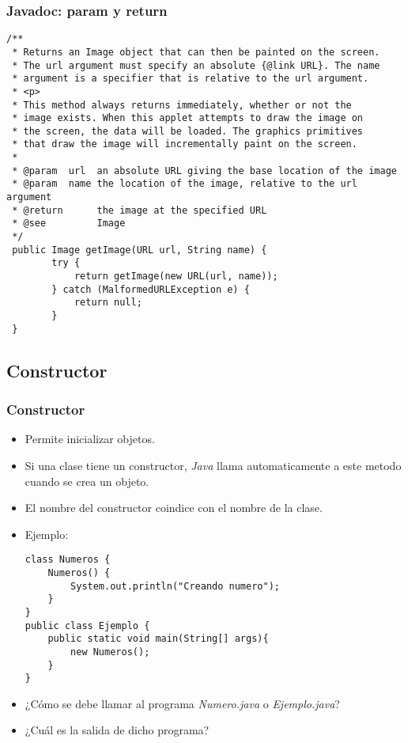 \documentclass{beamer}
\begin{document}
\begin{frame}[fragile]
\frametitle{Javadoc: param y return}
\begin{footnotesize}
\begin{verbatim}
/**
 * Returns an Image object that can then be painted on the screen. 
 * The url argument must specify an absolute {@link URL}. The name
 * argument is a specifier that is relative to the url argument. 
 * <p>
 * This method always returns immediately, whether or not the 
 * image exists. When this applet attempts to draw the image on
 * the screen, the data will be loaded. The graphics primitives 
 * that draw the image will incrementally paint on the screen. 
 *
 * @param  url  an absolute URL giving the base location of the image
 * @param  name the location of the image, relative to the url argument
 * @return      the image at the specified URL
 * @see         Image
 */
 public Image getImage(URL url, String name) {
        try {
            return getImage(new URL(url, name));
        } catch (MalformedURLException e) {
            return null;
        }
 }
\end{verbatim}
\end{footnotesize}
\end{frame}


\subsection{Constructor}
\begin{frame}[fragile]
\frametitle{Constructor}
\begin{itemize}[<+-|alert@+>]
\item Permite inicializar objetos.
\item Si una clase tiene un constructor, \emph{Java} llama automaticamente a este metodo cuando se crea un objeto.
\item El nombre del constructor coindice con el nombre de la clase.
\item Ejemplo:
\begin{verbatim}
class Numeros {
    Numeros() {
        System.out.println("Creando numero");
    }
}    
public class Ejemplo {
    public static void main(String[] args){
        new Numeros();
    }
}    
\end{verbatim}
\item ¿Cómo se debe llamar al programa \emph{Numero.java} o \emph{Ejemplo.java}?
\item ¿Cuál es la salida de dicho programa?
\end{itemize}
\pause
\end{frame}
\end{document}
